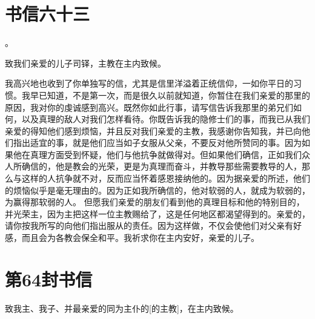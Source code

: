 
\section{书信六十三}

。\par

致我们亲爱的儿子司铎，主教在主内致候。\par

我高兴地也收到了你单独写的信，尤其是信里洋溢着正统信仰，一如你平日的习惯。我早已知道，不是第一次，而是很久以前就知道，你暂住在我们亲爱的那里的原因，我对你的虔诚感到高兴。既然你如此行事，请写信告诉我那里的弟兄们如何，以及真理的敌人对我们怎样看待。你既告诉我的隐修士们的事，而我已从我们亲爱的得知他们感到烦恼，并且反对我们亲爱的主教，我感谢你告知我，并已向他们指出适宜的事，就是他们应当如子女服从父亲，不要反对他所赞同的事。因为如果他在真理方面受到怀疑，他们与他抗争就做得对。但如果他们确信，正如我们众人所确信的，他是教会的光荣，更是为真理而奋斗，并教导那些需要教导的人，那么与这样的人抗争就不对，反而应当怀着感恩接纳他的。因为据亲爱的所述，他们的烦恼似乎是毫无理由的。因为正如我所确信的，他对软弱的人，就成为软弱的，为赢得那软弱的人。 但愿我们亲爱的朋友们看到他的真理目标和他的特别目的，并光荣主，因为主把这样一位主教赐给了，这是任何地区都渴望得到的。亲爱的，请你按我所写的向他们指出服从的责任。因为这样做，不仅会使他们对父亲有好感，而且会为各教会保全和平。我祈求你在主内安好，亲爱的儿子。\par



\section{第64封书信}

\par

致我主、我子、并最亲爱的同为主仆的[的主教]，在主内致候。\par


